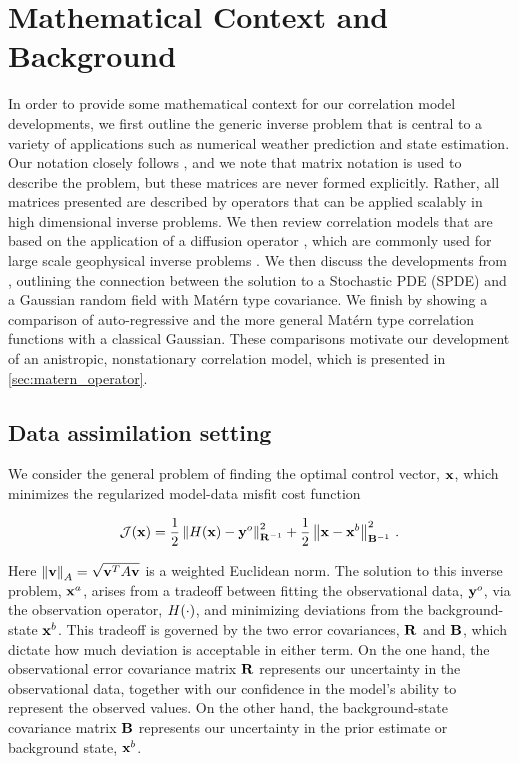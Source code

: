 \section{Mathematical Context and Background}
\label{sec:review}

In order to provide some mathematical context for our correlation model
developments, we first outline the generic inverse problem that is central to
a variety of applications such as numerical weather prediction and state
estimation.
Our notation closely follows \citet{ide_unified_1997}, and we note that matrix
notation is used to describe the problem, but these matrices are never formed
explicitly.
Rather, all matrices presented are described by operators that can be applied
scalably in high dimensional inverse problems.
We then review correlation models that are based on the application of a
diffusion operator \citep{weaver_correlation_2001,mirouze_representation_2010},
which are commonly used for large scale geophysical inverse problems
\citep[e.g.][]{forgetECCOv4,moore_regional_2011-1}.
We then discuss the developments from \citet{RSSB:RSSB777}, outlining the
connection between the solution to a Stochastic PDE (SPDE) and a Gaussian random
field with Mat\'ern type covariance.
We finish by showing a comparison of auto-regressive and the more general
Mat\'ern type correlation functions with a classical Gaussian.
These comparisons motivate our development of an anistropic, nonstationary correlation
model, which is presented in \cref{sec:matern_operator}.


\subsection{Data assimilation setting}
\label{ssec:da_formulation}

We consider the general problem of finding the optimal control vector,
$\mathbf{x}$, which minimizes the regularized model-data misfit cost function
\begin{linenomath*}\begin{equation*}
    \mathcal{J}(\mathbf{x}) =
        \dfrac{1}{2}\left\lVert H(\mathbf{x}) - \mathbf{y}^{o}\right\rVert_{\mathbf{R}^{-1}}^2
        +
        \dfrac{1}{2}\left\lVert\mathbf{x} - \mathbf{x}^{b}\right\rVert_{\mathbf{B}^{-1}}^2 \, .
\end{equation*}\end{linenomath*}
Here $\left\lVert\mathbf{v}\right\rVert_A = \sqrt{\mathbf{v}^T A \mathbf{v}}$ is a weighted
Euclidean norm.
The solution to this inverse problem, $\mathbf{x}^{a}$, arises from a tradeoff between fitting the
observational data, $\mathbf{y}^{o}$, via the observation operator, $H(\cdot)$,
and minimizing deviations from the background-state $\mathbf{x}^{b}$.
This tradeoff is governed by the two error covariances, $\mathbf{R}$ and
$\mathbf{B}$, which dictate how much deviation is acceptable in either term.
On the one hand, the observational error covariance matrix
$\mathbf{R}$ represents our uncertainty
in the observational data, together with our confidence in the model's ability
to represent the observed values.
On the other hand, the background-state covariance matrix $\mathbf{B}$
represents our uncertainty in the prior estimate or background state,
$\mathbf{x}^{b}$.

